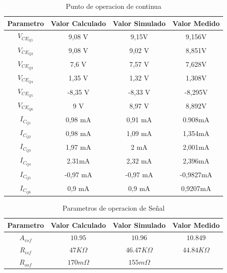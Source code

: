 \documentclass[11pt,a4paper]{article}
\begin{document}
\begin{table}
\centering
\begin{tabular}{ |c|c|c|c| } \hline
Parametro       & Valor Calculado & Valor Simulado & Valor Medido \\ \hline         
\(V_{CE_{Q1}}\) &    9,08 V       &   9,15V        &  9,156V      \\ \hline 
\(V_{CE_{Q2}}\) &    9,08 V       &   9,02 V       &  8,851V      \\ \hline 
\(V_{CE_{Q3}}\) &    7,6 V        &   7,57 V       &  7,628V      \\ \hline 
\(V_{CE_{Q4}}\) &    1,35 V       &   1,32 V       &  1,308V      \\ \hline 
\(V_{CE_{Q5}}\) &   -8,35 V       &  -8,33 V       & -8,295V      \\ \hline 
\(V_{CE_{Q6}}\) &    9 V          &   8,97 V       &  8,892V      \\ \hline 
\(I_{C_{Q1}}\)  &    0,98 mA      &   0,91 mA      &  0.908mA     \\ \hline 
\(I_{C_{Q2}}\)  &    0,98 mA      &   1,09 mA      &  1,354mA     \\ \hline 
\(I_{C_{Q3}}\)  &    1,97 mA      &   2 mA         &  2,001mA     \\ \hline 
\(I_{C_{Q4}}\)  &    2.31mA       &   2,32 mA      &  2,396mA     \\ \hline 
\(I_{C_{Q5}}\)  &   -0,97 mA      &  -0,97 mA      & -0,9827mA    \\ \hline 
\(I_{C_{Q6}}\)  &    0,9 mA       &   0,9 mA       &  0,9207mA    \\ \hline 
\end{tabular}
\caption {Punto de operacion de continua}
\label{tab:cc}
\end{table}


\begin{table}
\centering
\begin{tabular}{ |c|c|c|c| } \hline
Parametro   & Valor Calculado & Valor Simulado    & Valor Medido      \\ \hline         
\(A_{vsf}\) & \(10.95\)       & \(10.96\)         & \(10.849\)        \\ \hline 
\(R_{isf}\) & \(47K\Omega\)   & \(46.47K\Omega\)  & \(44.84K\Omega\)  \\ \hline 
\(R_{osf}\) & \(170m\Omega\)  & \(155m\Omega\)    &                   \\ \hline 
\end{tabular}
\caption {Parametros de operacion de Señal}
\label{tab:xsf} 
\end{table}
\end{document}
